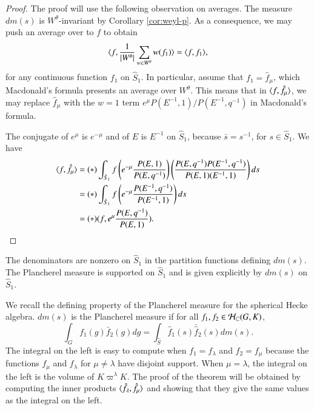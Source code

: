 \begin{proof}
The proof will use the following observation on averages.
The  measure $dm(s)$ is $W^\theta$-invariant by Corollary \ref{cor:weyl-p}.  As a consequence,
we may push an average over to $f$ to obtain
\begin{equation}\label{eqn:inv}
\langle{f,\frac{1}{|W^\theta|}\sum_{w\in W^\theta} w(f_1)}\rangle = \langle{f,f_1}\rangle,
\end{equation}
for any continuous function $f_1$ on $\hat S_1$.
In particular, assume that $f_1=\hat f_\mu$, which Macdonald's
formula presents an average over $W^\theta$.
This means that in $\langle{f,\hat f_\mu}\rangle$, we may replace 
$\hat f_\mu$  with
the $w=1$ term $e^{\mu} P(E^{-1},1)/{P(E^{-1},q^{-1})}$ in Macdonald's formula.

The conjugate of $e^\mu$ is $e^{-\mu}$ and of $E$ is $E^{-1}$ on $\hat S_1$, because $\bar s = s^{-1}$, for $s\in \hat S_1$.
We have
\begin{align*}
\langle{f,\hat f_\mu}\rangle &=
(*)\int_{\hat S_1} f \left(e^{-\mu} \frac{P(E,1)}{P(E,q^{-1})}\right) \left(\frac{P(E,q^{-1}) P(E^{-1},q^{-1})}{P(E,1)(E^{-1},1)}\right) ds\\
&=
(*)\int_{\hat S_1} f \left(e^{-\mu} \frac{P(E^{-1},q^{-1})}{P(E^{-1},1)}\right) ds\\
&=
(*) (f, e^\mu\frac{ P(E,q^{-1})}{P(E,1)}).
\end{align*}
\end{proof}

\begin{theorem}
The denominators are nonzero on $\hat S_1$ in the partition functions defining 
$dm(s)$. 
The Plancherel measure is supported on $\hat S_1$ and is given explicitly by $dm(s)$ on $\hat S_1$.
\end{theorem}

We recall the defining property of the Plancherel measure
for the spherical Hecke algebra.  $dm(s)$ is the Plancherel measure if
for all $f_1,f_2\in \mathcal H_{\mathbb{C}}(G,K)$,
\[
\int_G f_1(g) \bar f_2 (g) dg = \int_{\hat S} \hat f_1(s) \bar {\hat f}_2 (s) dm(s).
\]
The integral on the left is easy to compute when $f_1 = f_\lambda$ and $f_2 = f_\mu$
because the functions $f_\mu$ and $f_\lambda$ for $\mu\ne\lambda$ have disjoint support.
When $\mu=\lambda$, the integral on the left is the volume of $K\varpi^\lambda K$.
The proof of the theorem will be obtained by computing the inner products $\langle{\hat f_\lambda,\hat f_\mu}\rangle$
and showing that they give the same values as the integral on the left.


